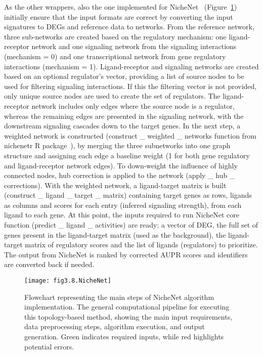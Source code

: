 As the other wrappers, also the one implemented for NicheNet~\cite{RN42} (Figure~\ref{fig:fig3.8.NicheNet}) initially ensure that the input formats are correct by converting the input signatures to DEGs and reference data to networks. From the reference network, three sub-networks are created based on the regulatory mechanism: one ligand-receptor network and one signaling network from the signaling interactions (mechanism = 0) and one transcriptional network from gene regulatory interactions (mechanism = 1). Ligand-receptor and signaling networks are created based on an optional regulator's vector, providing a list of source nodes to be used for filtering signaling interactions. 
If this the filtering vector is not provided, only unique source nodes are used to create the set of regulators. The ligand-receptor network includes only edges where the source node is a regulator, whereas the remaining edges are presented in the signaling network, with the downstream signaling cascades down to the target genes. In the next step, a weighted network is constructed (construct \_ weighted \_ networks function from nichenetr \gls{R} package~\cite{RN42}), by merging the three subnetworks into one graph structure and assigning each edge a baseline weight (1 for both gene regulatory and ligand-receptor network edges). 
To down-weight the influence of highly connected nodes, hub correction is applied to the network (apply \_ hub \_ corrections). With the weighted network, a ligand-target matrix is built (construct \_ ligand \_ target \_ matrix) containing target genes as rows, ligands as columns and scores for each entry (inferred signaling strength), from each ligand to each gene. At this point, the inputs required to run NicheNet core function (predict \_ ligand \_ activities) are ready: a vector of DEG, the full set of genes present in the ligand-target matrix (used as the background), the ligand-target matrix of regulatory scores and the list of ligands (regulators) to prioritize. The output from NicheNet is ranked by corrected \gls{AUPR} scores and identifiers are converted back if needed.

\begin{figure}[htbp]
    \centering
    \texttt{[image: fig3.8.NicheNet]}
    \caption[Flowchart representing the main steps of NicheNet algorithm implementation.]{Flowchart representing the main steps of NicheNet algorithm implementation. The general computational pipeline for executing this topology-based method, showing the main input requirements, data preprocessing steps, algorithm execution, and output generation. Green indicates required inputs, while red highlights potential errors.}
    \label{fig:fig3.8.NicheNet}
\end{figure}

